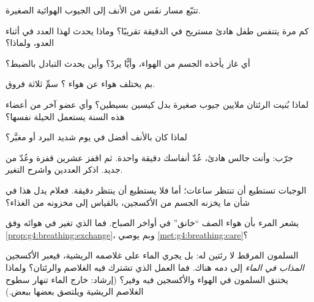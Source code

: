 \begin{exercise}[$\star$]\label{exo:g4:breathing:2}
تتبّع مسار نفَس من الأنف إلى الجيوب الهوائية الصغيرة.
\end{exercise}

\begin{exercise}[$\star$]\label{exo:g4:breathing:3}
كم مرة يتنفس طفل هادئ مستريح في الدقيقة تقريبًا؟ وماذا يحدث لهذا
العدد في أثناء العدو، ولماذا؟
\end{exercise}

\begin{exercise}[$\star$]\label{exo:g4:breathing:4}
أي غاز يأخذه الجسم من الهواء، وأيًّا يردّ؟ وأين يحدث التبادل
بالضبط؟
\end{exercise}

\begin{exercise}[$\star$]\label{exo:g4:breathing:5}
بم يختلف هواء  عن هواء ؟ سمِّ ثلاثة فروق.
\end{exercise}

\begin{exercise}[$\star$]\label{exo:g4:breathing:6}
لماذا بُنيت الرئتان ملايين جيوب صغيرة بدل كيسين بسيطين؟ وأي عضو
آخر من أعضاء هذه السنة يستعمل الحيلة نفسها؟
\end{exercise}

\begin{exercise}[$\star$]\label{exo:g4:breathing:7}
لماذا كان  بالأنف أفضل في يوم شديد البرد أو مغبَّر؟
\end{exercise}

\begin{exercise}[$\star$]\label{exo:g4:breathing:8}
جرّب: وأنت جالس هادئ، عُدّ أنفاسك دقيقة واحدة. ثم اقفز عشرين قفزة
وعُدّ من جديد. اذكر العددين واشرح التغير.
\end{exercise}

\begin{exercise}[$\star\star$]\label{exo:g4:breathing:9}
الوجبات تستطيع أن تنتظر ساعات؛ أما  فلا يستطيع أن ينتظر
دقيقة. فعلام يدل هذا في شأن ما يخزنه الجسم من الأكسجين، بالقياس
إلى مخزونه من الغذاء؟
\end{exercise}

\begin{exercise}[$\star\star$]\label{exo:g4:breathing:10}
يشعر المرء بأن هواء الصف ``خانق'' في أواخر الصباح. فما الذي تغير
في هوائه وفق \cref{prop:g4:breathing:exchange}، وبم يوصي
\cref{met:g4:breathing:care}؟
\end{exercise}

\begin{exercise}[$\star\star\star$]\label{exo:g4:breathing:11}
السلمون المرقط لا رئتين له: بل يجري الماء على غلاصمه الريشية،
فيعبر الأكسجين \emph{المذاب في الماء} إلى دمه هناك. فما العمل الذي
تشترك فيه الغلاصم والرئتان؟ ولماذا يختنق السلمون في الهواء والأكسجين
فيه وفير؟ (إرشاد: خارج الماء تنهار سطوح الغلاصم الريشية ويلتصق
بعضها ببعض.)
\end{exercise}
